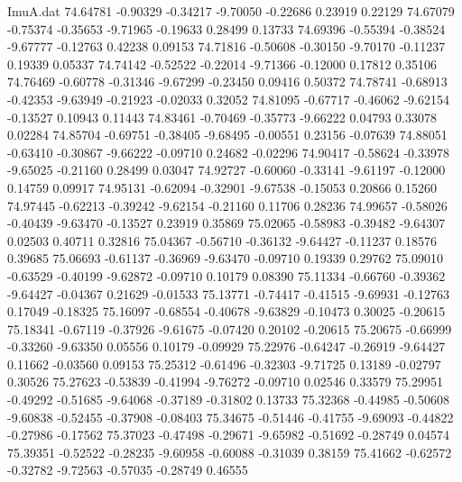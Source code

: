 \begin{filecontents}{ImuA.dat}
  74.64781   -0.90329   -0.34217   -9.70050   -0.22686    0.23919    0.22129
  74.67079   -0.75374   -0.35653   -9.71965   -0.19633    0.28499    0.13733
  74.69396   -0.55394   -0.38524   -9.67777   -0.12763    0.42238    0.09153
  74.71816   -0.50608   -0.30150   -9.70170   -0.11237    0.19339    0.05337
  74.74142   -0.52522   -0.22014   -9.71366   -0.12000    0.17812    0.35106
  74.76469   -0.60778   -0.31346   -9.67299   -0.23450    0.09416    0.50372
  74.78741   -0.68913   -0.42353   -9.63949   -0.21923   -0.02033    0.32052
  74.81095   -0.67717   -0.46062   -9.62154   -0.13527    0.10943    0.11443
  74.83461   -0.70469   -0.35773   -9.66222    0.04793    0.33078    0.02284
  74.85704   -0.69751   -0.38405   -9.68495   -0.00551    0.23156   -0.07639
  74.88051   -0.63410   -0.30867   -9.66222   -0.09710    0.24682   -0.02296
  74.90417   -0.58624   -0.33978   -9.65025   -0.21160    0.28499    0.03047
  74.92727   -0.60060   -0.33141   -9.61197   -0.12000    0.14759    0.09917
  74.95131   -0.62094   -0.32901   -9.67538   -0.15053    0.20866    0.15260
  74.97445   -0.62213   -0.39242   -9.62154   -0.21160    0.11706    0.28236
  74.99657   -0.58026   -0.40439   -9.63470   -0.13527    0.23919    0.35869
  75.02065   -0.58983   -0.39482   -9.64307    0.02503    0.40711    0.32816
  75.04367   -0.56710   -0.36132   -9.64427   -0.11237    0.18576    0.39685
  75.06693   -0.61137   -0.36969   -9.63470   -0.09710    0.19339    0.29762
  75.09010   -0.63529   -0.40199   -9.62872   -0.09710    0.10179    0.08390
  75.11334   -0.66760   -0.39362   -9.64427   -0.04367    0.21629   -0.01533
  75.13771   -0.74417   -0.41515   -9.69931   -0.12763    0.17049   -0.18325
  75.16097   -0.68554   -0.40678   -9.63829   -0.10473    0.30025   -0.20615
  75.18341   -0.67119   -0.37926   -9.61675   -0.07420    0.20102   -0.20615
  75.20675   -0.66999   -0.33260   -9.63350    0.05556    0.10179   -0.09929
  75.22976   -0.64247   -0.26919   -9.64427    0.11662   -0.03560    0.09153
  75.25312   -0.61496   -0.32303   -9.71725    0.13189   -0.02797    0.30526
  75.27623   -0.53839   -0.41994   -9.76272   -0.09710    0.02546    0.33579
  75.29951   -0.49292   -0.51685   -9.64068   -0.37189   -0.31802    0.13733
  75.32368   -0.44985   -0.50608   -9.60838   -0.52455   -0.37908   -0.08403
  75.34675   -0.51446   -0.41755   -9.69093   -0.44822   -0.27986   -0.17562
  75.37023   -0.47498   -0.29671   -9.65982   -0.51692   -0.28749    0.04574
  75.39351   -0.52522   -0.28235   -9.60958   -0.60088   -0.31039    0.38159
  75.41662   -0.62572   -0.32782   -9.72563   -0.57035   -0.28749    0.46555

\end{filecontents}
